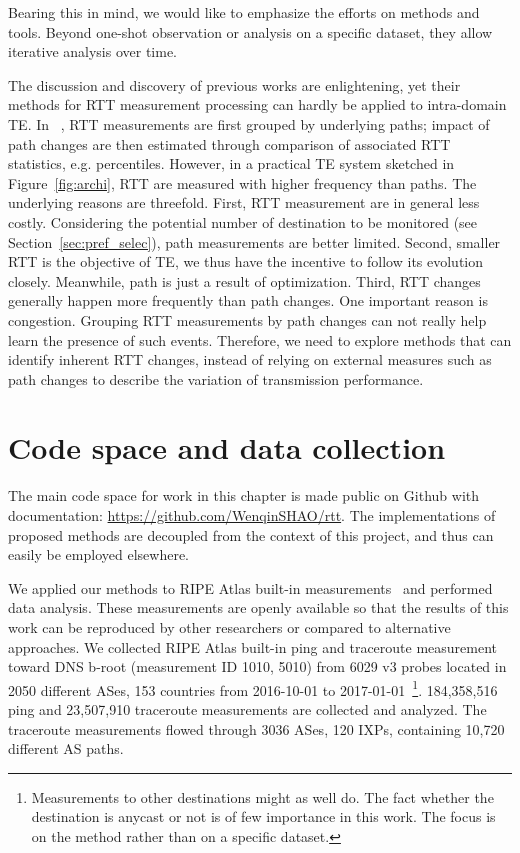 Bearing this in mind, we would like to emphasize the efforts on methods and tools. 
Beyond one-shot observation or analysis on a specific dataset, they allow iterative analysis over time.

The discussion and discovery of previous works are enlightening, yet their methods for RTT measurement processing can hardly be applied to intra-domain TE.
In ~\cite{Pucha2007, Schwartz2010, Chandrasekaran},
RTT measurements are first grouped by underlying paths; 
impact of path changes are then estimated through comparison of associated RTT statistics, e.g. percentiles.
However, in a practical TE system sketched in Figure~\ref{fig:archi}, RTT are measured with higher frequency than paths.
The underlying reasons are threefold.
First, RTT measurement are in general less costly. 
Considering the potential number of destination to be monitored (see Section~\ref{sec:pref_selec}), path measurements are better limited.
Second, smaller RTT is the objective of TE, we thus have the incentive to follow its evolution closely. Meanwhile, path is just a result of optimization.
Third, RTT changes generally happen more frequently than path changes.
One important reason is congestion.
Grouping RTT measurements by path changes can not really help learn the presence of
such events.
Therefore, we need to explore methods that can identify inherent RTT changes, instead of relying on external measures such as path changes to describe the variation of transmission performance.

\section{Code space and data collection}
\label{sec:cpt_data}
The main code space for work in this chapter is made public on Github with documentation: \url{https://github.com/WenqinSHAO/rtt}.
The implementations of proposed methods are decoupled from the context of this project, and thus can easily be employed elsewhere.  

We applied our methods to RIPE Atlas built-in measurements~\cite{atlas} and performed data analysis.
These measurements are openly available so that the results of this work can be reproduced by other researchers or compared to alternative approaches.
We collected RIPE Atlas built-in ping and traceroute measurement toward DNS b-root (measurement ID 1010, 5010) from 6029 v3 probes located in 2050 different ASes, 153 countries from 2016-10-01 to 2017-01-01~\footnote{Measurements to other destinations might as well do. The fact whether the destination is anycast or not is of few importance in this work. The focus is on the method rather than on a specific dataset.}.
184,358,516 ping and 23,507,910 traceroute measurements are collected and analyzed.
The traceroute measurements flowed through 3036 ASes, 120 IXPs, containing 10,720 different AS paths.


